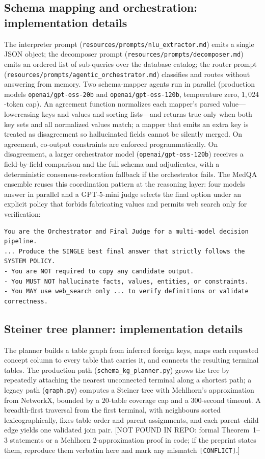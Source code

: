 \subsection*{Schema mapping and orchestration: implementation details}

The interpreter prompt (\texttt{resources/prompts/nlu\_extractor.md}) emits a single JSON object; the decomposer prompt (\texttt{resources/prompts/decomposer.md}) emits an ordered list of sub-queries over the database catalog; the router prompt (\texttt{resources/prompts/agentic\_orchestrator.md}) classifies and routes without answering from memory. Two schema-mapper agents run in parallel (production models \texttt{openai/gpt-oss-20b} and \texttt{openai/gpt-oss-120b}, temperature zero, $1{,}024$-token cap). An agreement function normalizes each mapper's parsed value---lowercasing keys and values and sorting lists---and returns true only when both key sets and all normalized values match; a mapper that emits an extra key is treated as disagreement so hallucinated fields cannot be silently merged. On agreement, co-output constraints are enforced programmatically. On disagreement, a larger orchestrator model (\texttt{openai/gpt-oss-120b}) receives a field-by-field comparison and the full schema and adjudicates, with a deterministic consensus-restoration fallback if the orchestrator fails. The MedQA ensemble reuses this coordination pattern at the reasoning layer: four models answer in parallel and a GPT-5-mini judge selects the final option under an explicit policy that forbids fabricating values and permits web search only for verification:
\begin{verbatim}
You are the Orchestrator and Final Judge for a multi-model decision pipeline.
... Produce the SINGLE best final answer that strictly follows the SYSTEM POLICY.
- You are NOT required to copy any candidate output.
- You MUST NOT hallucinate facts, values, entities, or constraints.
- You MAY use web_search only ... to verify definitions or validate correctness.
\end{verbatim}

\subsection*{Steiner tree planner: implementation details}

The planner builds a table graph from inferred foreign keys, maps each requested concept column to every table that carries it, and connects the resulting terminal tables. The production path (\texttt{schema\_kg\_planner.py}) grows the tree by repeatedly attaching the nearest unconnected terminal along a shortest path; a legacy path (\texttt{graph.py}) computes a Steiner tree with Mehlhorn's approximation from NetworkX, bounded by a $20$-table coverage cap and a $300$-second timeout. A breadth-first traversal from the first terminal, with neighbours sorted lexicographically, fixes table order and parent assignments, and each parent--child edge yields one validated join pair. [NOT FOUND IN REPO: formal Theorem~1--3 statements or a Mehlhorn 2-approximation proof in code; if the preprint states them, reproduce them verbatim here and mark any mismatch \texttt{[CONFLICT]}.]

